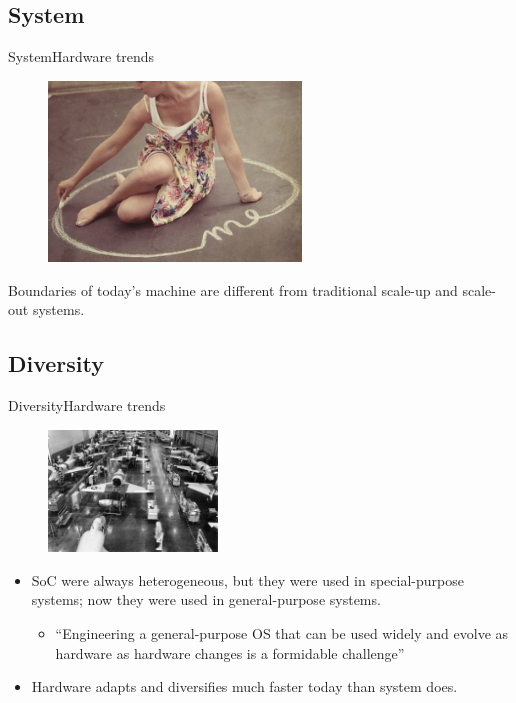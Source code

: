 \documentclass[10pt]{beamer}
\begin{document}
\subsection{System}
\begin{frame}{System}{Hardware trends}
  \begin{figure}[ht]
    \includegraphics[width=0.6\textwidth, keepaspectratio=true]{images/boundary.jpg}
  \end{figure} \pause

  \begin{block}{}
    Boundaries of today's machine are different from traditional scale-up and
    scale-out systems.
   \end{block}
\end{frame}

\subsection{Diversity}
\begin{frame}{Diversity}{Hardware trends}
  \begin{figure}[ht]
    \includegraphics[width=0.4\textwidth, keepaspectratio=true]{images/diversity.jpg}
  \end{figure} \pause

  \begin{itemize}
    \item SoC were always heterogeneous, but they were used in special-purpose
          systems; now they were used in general-purpose systems.\pause
      \begin{itemize}
        \item ``Engineering a general-purpose OS that can be used widely and
             evolve as hardware as hardware changes is a formidable challenge''
      \end{itemize}\pause
    \item Hardware adapts and diversifies much faster today than system does.
   \end{itemize}
\end{frame}
\end{document}
